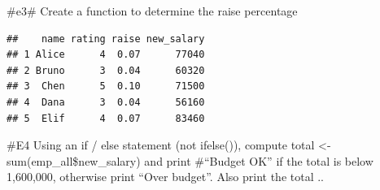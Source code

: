 \documentclass[
]{article}
\newenvironment{Shaded}{\begin{snugshade}}{\end{snugshade}}
\newcommand{\CommentTok}[1]{\textcolor[rgb]{0.56,0.35,0.01}{\textit{#1}}}
\newcommand{\ControlFlowTok}[1]{\textcolor[rgb]{0.13,0.29,0.53}{\textbf{#1}}}
\newcommand{\DecValTok}[1]{\textcolor[rgb]{0.00,0.00,0.81}{#1}}
\newcommand{\FloatTok}[1]{\textcolor[rgb]{0.00,0.00,0.81}{#1}}
\newcommand{\FunctionTok}[1]{\textcolor[rgb]{0.13,0.29,0.53}{\textbf{#1}}}
\newcommand{\NormalTok}[1]{#1}
\newcommand{\OtherTok}[1]{\textcolor[rgb]{0.56,0.35,0.01}{#1}}
\newcommand{\SpecialCharTok}[1]{\textcolor[rgb]{0.81,0.36,0.00}{\textbf{#1}}}
\newcommand{\StringTok}[1]{\textcolor[rgb]{0.31,0.60,0.02}{#1}}
\begin{document}
\#e3\# Create a function to determine the raise percentage

\begin{Shaded}
\end{Shaded}

\begin{verbatim}
##    name rating raise new_salary
## 1 Alice      4  0.07      77040
## 2 Bruno      3  0.04      60320
## 3  Chen      5  0.10      71500
## 4  Dana      3  0.04      56160
## 5  Elif      4  0.07      83460
\end{verbatim}

\#E4 Using an if / else statement (not ifelse()), compute total
\textless- sum(emp\_all\$new\_salary) and print \#``Budget OK'' if the
total is below 1,600,000, otherwise print ``Over budget''. Also print
the total ..
\end{document}
